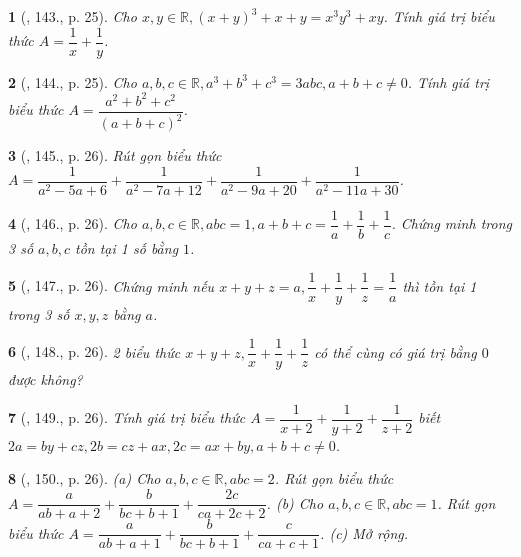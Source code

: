 \documentclass{article}
\newtheorem{baitoan}{}
\begin{document}
\begin{baitoan}[\cite{Binh_Toan_8_tap_1}, 143., p. 25]
	Cho $x,y\in\mathbb{R},(x + y)^3 + x + y = x^3y^3 + xy$. Tính giá trị biểu thức $A = \dfrac{1}{x} + \dfrac{1}{y}$.
\end{baitoan}

\begin{baitoan}[\cite{Binh_Toan_8_tap_1}, 144., p. 25]
	Cho $a,b,c\in\mathbb{R},a^3 + b^3 + c^3 = 3abc,a + b + c\ne0$. Tính giá trị biểu thức $A = \dfrac{a^2 + b^2 + c^2}{(a + b + c)^2}$.
\end{baitoan}

\begin{baitoan}[\cite{Binh_Toan_8_tap_1}, 145., p. 26]
	Rút gọn biểu thức $A = \dfrac{1}{a^2 - 5a + 6} + \dfrac{1}{a^2 - 7a + 12} + \dfrac{1}{a^2 - 9a + 20} + \dfrac{1}{a^2 - 11a + 30}$.
\end{baitoan}

\begin{baitoan}[\cite{Binh_Toan_8_tap_1}, 146., p. 26]
	Cho $a,b,c\in\mathbb{R},abc = 1,a + b + c = \dfrac{1}{a} + \dfrac{1}{b} + \dfrac{1}{c}$. Chứng minh trong 3 số $a,b,c$ tồn tại 1 số bằng $1$.
\end{baitoan}

\begin{baitoan}[\cite{Binh_Toan_8_tap_1}, 147., p. 26]
	Chứng minh nếu $x + y + z = a,\dfrac{1}{x} + \dfrac{1}{y} + \dfrac{1}{z} = \dfrac{1}{a}$ thì tồn tại 1 trong 3 số $x,y,z$ bằng $a$.
\end{baitoan}

\begin{baitoan}[\cite{Binh_Toan_8_tap_1}, 148., p. 26]
	2 biểu thức $x + y + z,\dfrac{1}{x} + \dfrac{1}{y} + \dfrac{1}{z}$ có thể cùng có giá trị bằng $0$ được không? 
\end{baitoan}

\begin{baitoan}[\cite{Binh_Toan_8_tap_1}, 149., p. 26]
	Tính giá trị biểu thức $A = \dfrac{1}{x + 2} + \dfrac{1}{y + 2} + \dfrac{1}{z + 2}$ biết $2a = by + cz,2b = cz + ax,2c = ax + by,a + b + c\ne0$.
\end{baitoan}

\begin{baitoan}[\cite{Binh_Toan_8_tap_1}, 150., p. 26]
	(a) Cho $a,b,c\in\mathbb{R},abc = 2$. Rút gọn biểu thức $A = \dfrac{a}{ab + a + 2} + \dfrac{b}{bc + b + 1} + \dfrac{2c}{ca + 2c + 2}$. (b) Cho $a,b,c\in\mathbb{R},abc = 1$. Rút gọn biểu thức $A = \dfrac{a}{ab + a + 1} + \dfrac{b}{bc + b + 1} + \dfrac{c}{ca + c + 1}$. (c) Mở rộng.
\end{baitoan}
\end{document}
